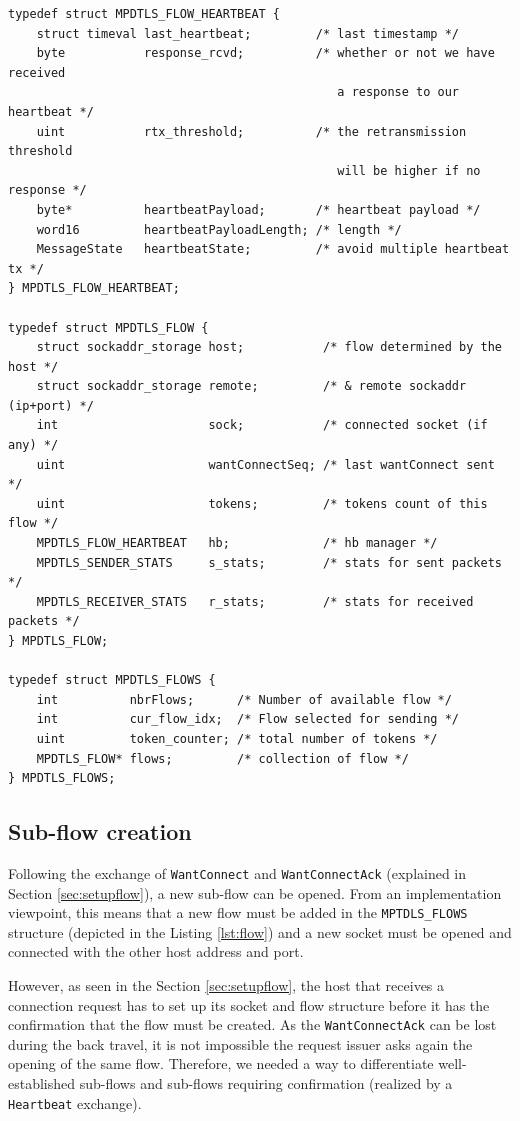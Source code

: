 \begin{lstlisting}[caption=Structures handling flows, label=lst:flow]
typedef struct MPDTLS_FLOW_HEARTBEAT {
    struct timeval last_heartbeat;         /* last timestamp */
    byte           response_rcvd;          /* whether or not we have received
                                              a response to our heartbeat */
    uint           rtx_threshold;          /* the retransmission threshold
                                              will be higher if no response */
    byte*          heartbeatPayload;       /* heartbeat payload */
    word16         heartbeatPayloadLength; /* length */
    MessageState   heartbeatState;         /* avoid multiple heartbeat tx */
} MPDTLS_FLOW_HEARTBEAT;

typedef struct MPDTLS_FLOW {
    struct sockaddr_storage host;           /* flow determined by the host */
    struct sockaddr_storage remote;         /* & remote sockaddr (ip+port) */
    int                     sock;           /* connected socket (if any) */
    uint                    wantConnectSeq; /* last wantConnect sent */
    uint                    tokens;         /* tokens count of this flow */
    MPDTLS_FLOW_HEARTBEAT   hb;             /* hb manager */
    MPDTLS_SENDER_STATS     s_stats;        /* stats for sent packets */
    MPDTLS_RECEIVER_STATS   r_stats;        /* stats for received packets */
} MPDTLS_FLOW;

typedef struct MPDTLS_FLOWS {
    int          nbrFlows;      /* Number of available flow */
    int          cur_flow_idx;  /* Flow selected for sending */
    uint         token_counter; /* total number of tokens */
    MPDTLS_FLOW* flows;         /* collection of flow */
} MPDTLS_FLOWS;
\end{lstlisting}

\subsection{Sub-flow creation}

Following the exchange of \texttt{WantConnect} and \texttt{WantConnectAck} (explained in Section \ref{sec:setupflow}), a new sub-flow can be opened. From an implementation viewpoint, this means that a new flow must be added in the \texttt{MPTDLS\_FLOWS} structure (depicted in the Listing \ref{lst:flow}) and a new socket must be opened and connected with the other host address and port.

However, as seen in the Section \ref{sec:setupflow}, the host that receives a connection request has to set up its socket and flow structure before it has the confirmation that the flow must be created. As the \texttt{WantConnectAck} can be lost during the back travel, it is not impossible the request issuer asks again the opening of the same flow. Therefore, we needed a way to differentiate well-established sub-flows and sub-flows requiring confirmation (realized by a \texttt{Heartbeat} exchange).

